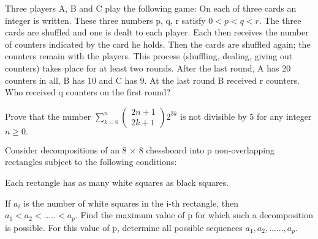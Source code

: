 \item Three players A, B and C play the following game: On each of three cards an integer is written. These three numbers p, q, r satisfy $0 < p < q < r.$ The three cards are shuffled and one is dealt to each player. Each then receives the number of counters indicated by the card he holds. Then the cards are shuffled again; the counters remain with the players. This process (shuffling, dealing, giving out counters) takes place for at least two rounds. After the last round, A has 20 counters in all, B has 10 and C has 9. At the last round B received r counters. Who received q counters on the first round?\\

\item Prove that the number $\sum_{k=0}^{n} \begin{pmatrix} 2n+1 \\ 2k+1 \end{pmatrix} 2^{3k}$ is not divisible by 5 for any integer $n \geq 0.$
\item Consider decompositions of an 8 $\times$ 8 chessboard into p non-overlapping rectangles subject to the following conditions:
\item Each rectangle has as many white squares as black squares.
\item  If $a_i$ is the number of white squares in the i-th rectangle, then $a_1 < a_2 <
..... < a_p.$ Find the maximum value of p for which such a decomposition is possible. For this value of p, determine all possible sequences $a_1, a_2,......, a_p.$

